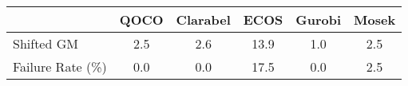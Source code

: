 \begin{tabular}{lccccc}
  \hline
   & \textbf{QOCO} & \textbf{Clarabel} & \textbf{ECOS} & \textbf{Gurobi} & \textbf{Mosek} \\ \hline
  Shifted GM & 2.5 & 2.6 & 13.9 & 1.0 & 2.5 \\ 
  Failure Rate (\%) & 0.0 & 0.0 & 17.5 & 0.0 & 2.5 \\ \hline 
\end{tabular}
